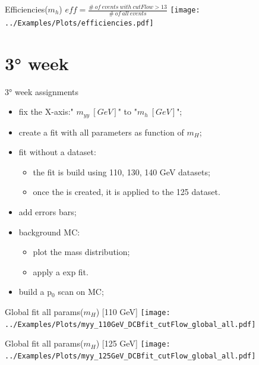 \documentclass[10pt,UKenglish, leqno, xcolor = dvipsnames]{beamer}
\begin{document}
		\begin{frame}{Efficiencies($m_h$)}
			\vspace{.8cm}
			\centering
			$eff = \frac{\#\ of\ events\ with\ cutFlow>13}{\#\ of\ all\ events}$
			\vspace{2.5cm}
			\texttt{[image: ../Examples/Plots/efficiencies.pdf]}
		\end{frame}
	
	\section{3° week}
	\SectionPage
	
		\begin{frame}{3° week assignments}
			\vfill
			\begin{itemize}
				\item fix the X-axis:" $m_{yy}\ [GeV]$" to "$m_{h}\ [GeV]$";
				\item create a fit with all parameters as function of $m_H$;
				\item fit without a dataset:
				\begin{itemize}
					\item the fit is build using 110, 130, 140 GeV datasets;
					\item once the is created, it is applied to the 125 dataset.
				\end{itemize}
				\item add errors bars;
				\item background MC:
				\begin{itemize}
					\item plot the mass distribution;
					\item apply a exp fit.
				\end{itemize}
				\item build a p$_{0}$ scan on MC;
			\end{itemize}
			\vfill
		\end{frame}
	
		\begin{frame}{Global fit all params($m_H$) [110 GeV]}
			\vfill
			\texttt{[image: ../Examples/Plots/myy\_110GeV\_DCBfit\_cutFlow\_global\_all.pdf]}
			\vfill
		\end{frame}
	
		\begin{frame}{Global fit all params($m_H$) [125 GeV]}
			\vfill
			\texttt{[image: ../Examples/Plots/myy\_125GeV\_DCBfit\_cutFlow\_global\_all.pdf]}
			\vfill
		\end{frame}
	
\end{document}
